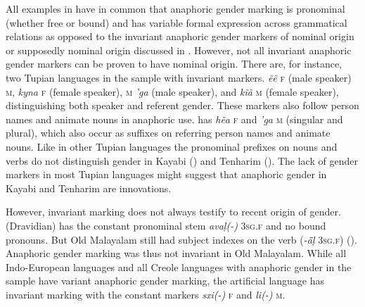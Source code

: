 \documentclass[output=collectionpaper]{langsci/langscibook}
\begin{document}
All examples in  have in common that anaphoric gender marking is pronominal (whether free or bound) and has variable formal expression across grammatical relations as opposed to the invariant anaphoric gender markers of nominal origin or supposedly nominal origin discussed in . However, not all invariant anaphoric gender markers can be proven to have nominal origin. There are, for instance, two Tupian languages in the sample with invariant markers.  \textit{ẽẽ} \textsc{f} (male speaker) \textsc{m}, \textit{kyna} \textsc{f} (female speaker), \textsc{m} \textit{'ga} (male speaker), and \textit{kĩã} \textsc{m} (female speaker), distinguishing both speaker and referent gender. These markers also follow person names and animate nouns in anaphoric use.  has \textit{hẽa} \textsc{f} and \textit{'ga} \textsc{m} (singular and plural), which also occur as suffixes on referring person names and animate nouns. Like in other Tupian languages the pronominal prefixes on nouns and verbs do not distinguish gender in Kayabi (\citealt[27]{Dobson2005}) and Tenharim (\citealt[17]{Betts1981}). The lack of gender markers in most Tupian languages might suggest that anaphoric gender in Kayabi and Tenharim are innovations.

However, invariant marking does not always testify to recent origin of gender.  (Dravidian) has the constant pronominal stem \textit{avaḷ(-)} \textsc{3sg.f} and no bound pronouns. But Old Malayalam still had subject indexes on the verb (\textit{-ǟḷ} \textsc{3sg.f}) (\citealt[120]{Andronov1996}). Anaphoric gender marking was thus not invariant in Old Malayalam. While all Indo-European languages and all Creole languages with anaphoric gender in the sample have variant anaphoric gender marking, the artificial language  has invariant marking with the constant markers \textit{sxi(-)} \textsc{f} and \textit{li(-)} \textsc{m}.
\end{document}

